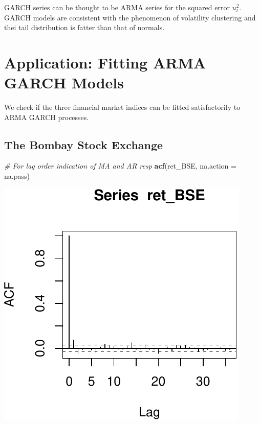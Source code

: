 \documentclass[11pt,]{article}
\newenvironment{Shaded}{\begin{snugshade}}{\end{snugshade}}
\newcommand{\KeywordTok}[1]{\textcolor[rgb]{0.13,0.29,0.53}{\textbf{#1}}}
\newcommand{\DataTypeTok}[1]{\textcolor[rgb]{0.13,0.29,0.53}{#1}}
\newcommand{\CommentTok}[1]{\textcolor[rgb]{0.56,0.35,0.01}{\textit{#1}}}
\newcommand{\NormalTok}[1]{#1}
\begin{document}
GARCH series can be thought to be ARMA series for the squared error
\(u_t^2\). GARCH models are consistent with the phenomenon of volatility
clustering and thei tail distribution is fatter than that of normals.

\section{Application: Fitting ARMA GARCH
Models}\label{application-fitting-arma-garch-models}

We check if the three financial market indices can be fitted
satisfactorily to ARMA GARCH processes.

\subsection{The Bombay Stock Exchange}\label{the-bombay-stock-exchange}

\begin{Shaded}
\begin{Highlighting}[]
\CommentTok{# For lag order indication of MA and AR resp}
\KeywordTok{acf}\NormalTok{(ret_BSE, }\DataTypeTok{na.action =}\NormalTok{ na.pass)}
\end{Highlighting}
\end{Shaded}

\begin{center}\includegraphics{FMC_T4_PhD_ARMA_GARCH_files/figure-latex/BSE_fit_ARMA_GARCH_ACF-1} \end{center}
\end{document}
